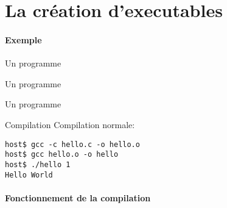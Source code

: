 %
%
%

\part{La création d'executables}

\begin{frame}
  \partpage
\end{frame}

\begin{frame}
  \tableofcontents[currentpart]
\end{frame}

\subsection{Exemple}

\begin{frame}[fragile=singleslide]{Un programme}{}
  
\end{frame}

\begin{frame}[fragile=singleslide]{Un programme}{}
  
\end{frame}

\begin{frame}[fragile=singleslide]{Un programme}{}
  
\end{frame}

\begin{frame}[fragile=singleslide]{Compilation}
  Compilation normale:
  \begin{lstlisting}
host$ gcc -c hello.c -o hello.o
host$ gcc hello.o -o hello
host$ ./hello 1
Hello World
  \end{lstlisting} %
\end{frame}

\subsection{Fonctionnement de la compilation}

